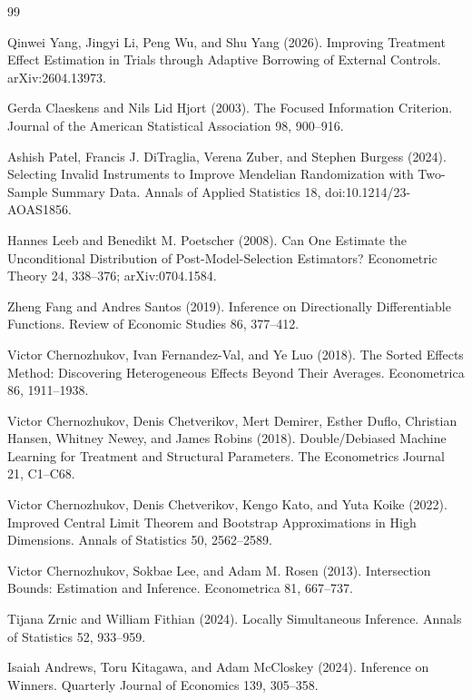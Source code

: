 \documentclass{article}
\begin{document}
\begin{thebibliography}{99}

   Qinwei Yang, Jingyi Li, Peng Wu, and Shu Yang (2026). Improving Treatment Effect Estimation in Trials through Adaptive Borrowing of External Controls. arXiv:2604.13973.

   Gerda Claeskens and Nils Lid Hjort (2003). The Focused Information Criterion. Journal of the American Statistical Association 98, 900--916.

   Ashish Patel, Francis J. DiTraglia, Verena Zuber, and Stephen Burgess (2024). Selecting Invalid Instruments to Improve Mendelian Randomization with Two-Sample Summary Data. Annals of Applied Statistics 18, doi:10.1214/23-AOAS1856.

   Hannes Leeb and Benedikt M. Poetscher (2008). Can One Estimate the Unconditional Distribution of Post-Model-Selection Estimators? Econometric Theory 24, 338--376; arXiv:0704.1584.

   Zheng Fang and Andres Santos (2019). Inference on Directionally Differentiable Functions. Review of Economic Studies 86, 377--412.

   Victor Chernozhukov, Ivan Fernandez-Val, and Ye Luo (2018). The Sorted Effects Method: Discovering Heterogeneous Effects Beyond Their Averages. Econometrica 86, 1911--1938.

   Victor Chernozhukov, Denis Chetverikov, Mert Demirer, Esther Duflo, Christian Hansen, Whitney Newey, and James Robins (2018). Double/Debiased Machine Learning for Treatment and Structural Parameters. The Econometrics Journal 21, C1--C68.

   Victor Chernozhukov, Denis Chetverikov, Kengo Kato, and Yuta Koike (2022). Improved Central Limit Theorem and Bootstrap Approximations in High Dimensions. Annals of Statistics 50, 2562--2589.

   Victor Chernozhukov, Sokbae Lee, and Adam M. Rosen (2013). Intersection Bounds: Estimation and Inference. Econometrica 81, 667--737.

   Tijana Zrnic and William Fithian (2024). Locally Simultaneous Inference. Annals of Statistics 52, 933--959.

   Isaiah Andrews, Toru Kitagawa, and Adam McCloskey (2024). Inference on Winners. Quarterly Journal of Economics 139, 305--358.


\end{thebibliography}
\end{document}
